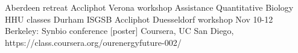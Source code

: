 Aberdeen retreat
Accliphot Verona workshop
Assistance Quantitative Biology HHU classes
Durham ISGSB
Accliphot Duesseldorf workshop
Nov 10-12 Berkeley: Synbio conference [poster]
Coursera, UC San Diego, https://class.coursera.org/ourenergyfuture-002/
